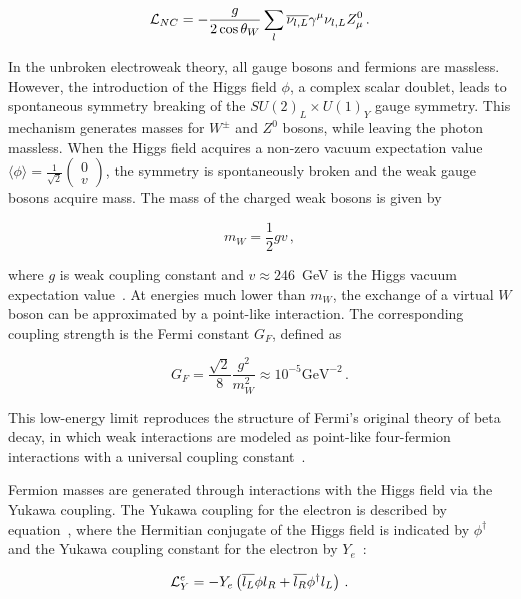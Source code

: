 \begin{equation}
\label{eq:Lagr_weak_NC}
    \mathcal{L}_{NC} = - \frac{g}{2 \cos \theta_W} \sum_l \overline{\nu_{l, L}} \gamma^{\mu} \nu_{l, L} Z^0_{\mu} \,.
\end{equation}


In the unbroken electroweak theory, all gauge bosons and fermions are massless. However, the introduction of the Higgs field $\phi$, a complex scalar doublet, leads to spontaneous symmetry breaking of the $SU(2)_L \times U(1)_Y$ gauge symmetry. This mechanism generates masses for $W^{\pm}$ and $Z^{0}$ bosons, while leaving the photon massless. 
When the Higgs field acquires a non-zero vacuum expectation value $\langle\phi \rangle  = \frac{1}{\sqrt{2}} \begin{pmatrix} 0 \\ v \end{pmatrix}$, the symmetry is spontaneously broken and the weak gauge bosons acquire mass. The mass of the charged weak bosons is given by

\begin{equation}
\label{eq:W_boson_mass}
    m_W = \frac{1}{2} g v \,,
\end{equation}

\noindent where $g$ is weak coupling constant and $v \approx 246$~GeV is the Higgs vacuum expectation value~\cite{navas_review_2024}. 
At energies much lower than $m_W$, the exchange of a virtual $W$ boson can be approximated by a point-like interaction. The corresponding coupling strength is the Fermi constant $G_F$, defined as

\begin{equation}
\label{eq:Fermi_constant}
    G_F = \frac{\sqrt{2}}{8} \frac{g^2}{m_W^2} \approx 10^{-5} \mathrm{GeV}^{-2} \,.
\end{equation}

This low-energy limit reproduces the structure of Fermi's original theory of beta decay, in which weak interactions are modeled as point-like four-fermion interactions with a universal coupling constant~\cite{peskin_introduction_2019}.

Fermion masses are generated through interactions with the Higgs field via the Yukawa coupling. The Yukawa coupling for the electron is described by equation~, where the Hermitian conjugate of the Higgs field is indicated by $\phi^\dagger$ and the Yukawa coupling constant for the electron by $Y_e$~\cite{peskin_introduction_2019}:

\begin{equation} 
\label{eq:Lagr_Yukawa_e}
		\mathcal{L}_Y^e = -Y_e \left( \overline{l_L} \phi l_R + \overline{l_R} \phi^{\dagger} l_L \right) \,.
\end{equation}

